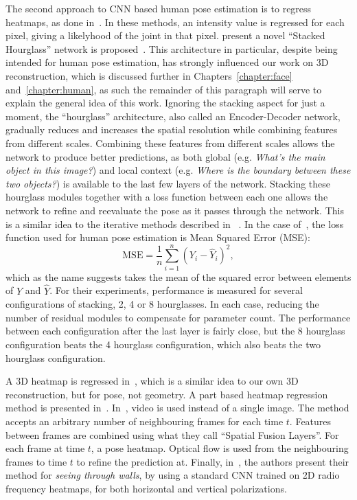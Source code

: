 The second approach to CNN based human pose estimation is to regress
heatmaps, as done
in~\cite{newell2016stacked,pfister2015flowing,zhou2016sparseness,pavlakos2017coarse,mehta2017vnect,zhao2018through}. In
these methods, an intensity value is regressed for each pixel, giving
a likelyhood of the joint in that pixel.
\citeauthor{newell2016stacked} present a novel ``Stacked Hourglass''
network is proposed~\cite{newell2016stacked}.  This architecture in
particular, despite being intended for human pose estimation, has
strongly influenced our work on 3D reconstruction, which is discussed
further in Chapters~\ref{chapter:face} and~\ref{chapter:human}, as
such the remainder of this paragraph will serve to explain the general
idea of this work. Ignoring the stacking aspect for just a moment, the
``hourglass'' architecture, also called an Encoder-Decoder network,
gradually reduces and increases the spatial resolution while combining
features from different scales. Combining these features from
different scales allows the network to produce better predictions, as
both global (e.g. \textit{What's the main object in this image?}) and
local context (e.g. \textit{Where is the boundary between these two
  objects?}) is available to the last few layers of the
network. Stacking these hourglass modules together with a loss
function between each one allows the network to refine and reevaluate
the pose as it passes through the network. This is a similar idea to
the iterative methods described in
~\cite{toshev2014deeppose,carreira2016human}. In the case
of~\cite{newell2016stacked}, the loss function used for human pose
estimation is Mean Squared Error (MSE):
%
\begin{equation}
  \text{MSE} = \frac{1}{n} \sum^n_{i=1} (Y_i - \hat{Y}_i)^2,
\end{equation}
%
which as the name suggests takes the mean of the
squared error between elements of $Y$ and $\hat{Y}$. For their
experiments, performance is measured for several configurations of
stacking, 2, 4 or 8 hourglasses. In each case, reducing the number of
residual modules to compensate for parameter count. The performance
between each configuration after the last layer is fairly close, but
the 8 hourglass configuration beats the 4 hourglass configuration,
which also beats the two hourglass configuration.


A 3D heatmap is regressed in~\cite{pavlakos2017coarse}, which is a
similar idea to our own 3D reconstruction, but for pose, not
geometry. A part based heatmap regression method is presented
in~\cite{mehta2017vnect}. In~\cite{pfister2015flowing}, video is used
instead of a single image. The method accepts an arbitrary number of
neighbouring frames for each time $t$. Features between frames are
combined using what they call ``Spatial Fusion Layers''. For each
frame at time $t$, a pose heatmap. Optical flow is used from the
neighbouring frames to time $t$ to refine the prediction at. Finally,
in~\cite{zhao2018through}, the authors present their method for
\textit{seeing through walls}, by using a standard CNN trained on 2D
radio frequency heatmaps, for both horizontal and vertical
polarizations.








